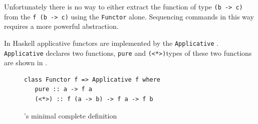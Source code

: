 Unfortunately there is no way to either extract the function of type \texttt{(b -> c)} from the \DIFdelbegin {}\DIFdelend \DIFaddbegin {}\DIFaddend \texttt{\DIFdelbegin \DIFdel{(}\DIFdelend f \DIFdelbegin {}%
\DIFdelend (\DIFdelbegin {}\DIFdelend b -> c)\DIFdelbegin \DIFdel{)}\DIFdelend \DIFaddbegin } \texttt{\DIFaddend } \DIFdelbegin {}\DIFdelend using the \texttt{Functor} \DIFdelbegin {}\DIFdelend \DIFaddbegin {}\DIFaddend alone. Sequencing commands in this way requires a more powerful abstraction\DIFdelbegin {}\DIFdelend \DIFaddbegin {}\DIFaddend . 

In Haskell applicative functors are implemented by the \texttt{Applicative} \DIFdelbegin {}\DIFdelend \DIFaddbegin {}\DIFaddend . \texttt{Applicative} declares two functions, \texttt{pure} and \texttt{(<*>)}\DIFdelbegin {}\DIFdelend \DIFaddbegin {}\DIFaddend types of these two functions are shown in \DIFdelbegin {}\texttt{} %
\DIFdelend \DIFaddbegin {}\DIFaddend . 

\begin{figure}[t]
\DIFdelbeginFL %

\DIFdelendFL \DIFaddbeginFL \begin{lstlisting}
class Functor f => Applicative f where
   pure :: a -> f a
   (<*>) :: f (a -> b) -> f a -> f b
\end{lstlisting}
\DIFaddendFL \caption{\DIFdelbeginFL {}\DIFdelendFL \DIFaddbeginFL \texttt{}\DIFaddendFL 's minimal complete definition}
\label{appTypes}
\end{figure}

